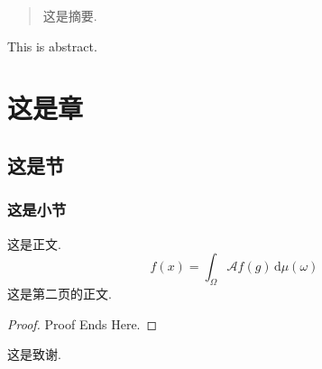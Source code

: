 \documentclass[oneside]{fdmthesis2023}
\theoremstyle{definition}
\theoremstyle{plain}
\theoremstyle{remark}
\begin{document}
  \frontmatter
    \begin{abstract}
      这是摘要.
    \end{abstract}

    \begin{abstract*}
      This is abstract.
    \end{abstract*}

    \tableofcontents

  \mainmatter
    \chapter{这是章}
      \section{这是节}
        \subsection{这是小节}
          这是正文.
          $$
            f(x)=\int_{\Omega}\mathscr{A}f(g)\,\mathrm{d}\mu(\omega)
          $$
          \newpage
          这是第二页的正文.
          \begin{proof}
            Proof Ends Here.
          \end{proof}

  \backmatter
    \begin{acknowledgement}
      这是致谢.
    \end{acknowledgement}

      
      
\end{document}
